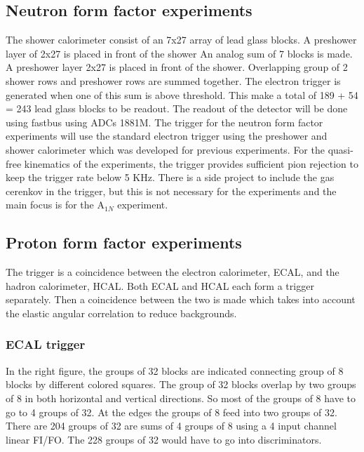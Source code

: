 \documentclass{article}
\begin{document}
\subsection{Neutron form factor experiments}
\label{sec:neutron-trig}
The shower calorimeter consist of an 7x27 array of  lead glass blocks. A preshower
 layer of 2x27 is placed in front of the shower
An analog sum of 7 blocks is made. 
A preshower layer 2x27 is placed in front of the shower.
Overlapping group of 2 shower rows and preshower rows are summed together. 
The electron trigger is generated when one of this sum is above threshold.
This make a total of 189 + 54 = 243 lead glass blocks to be readout.
The readout of the detector will be done using fastbus using ADCs 1881M.
 The trigger for the neutron form factor experiments will use the 
standard electron trigger using the preshower and shower calorimeter which was developed for previous experiments. 
For the quasi-free kinematics of the experiments, the trigger provides sufficient pion rejection to keep the
trigger rate below 5 KHz. There is a side project to include the gas cerenkov in the trigger, but this
is not necessary for the experiments and the main focus is for the A$_{1N}$ experiment.

\subsection{Proton form factor experiments}
The trigger is a coincidence between the electron calorimeter, ECAL,  and the hadron calorimeter, HCAL.
Both ECAL and HCAL each form a trigger separately. Then a coincidence between the two is made which
takes into account the elastic angular correlation to reduce backgrounds.

\subsubsection{ECAL trigger}
\label{sec:ecal-trig}
 In the right   figure, the groups of 32 blocks are indicated connecting
group of 8 blocks by different colored squares. The group of 32 blocks overlap
by two groups of 8 in both horizontal and vertical directions. So most of the
groups of 8 have to go to 4 groups of 32. At the edges the groups of 8 feed into
two groups of 32. There are 204  groups of 32 are sums of 4 groups of 8 using
a 4 input channel linear FI/FO. The 228 groups of 32 would have to
go into discriminators.
\end{document}
